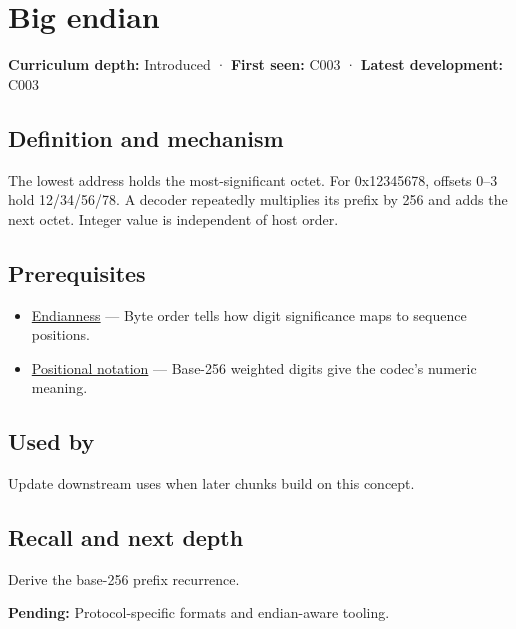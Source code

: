 \hypertarget{appendix-92e040df969a}{}\label{referencestart:appendix-92e040df969a}
\section{Big endian}\label{appendix-92e040df969a-big-endian}

\textbf{Curriculum depth:} Introduced · \textbf{First seen:} C003 · \textbf{Latest development:} C003

\subsection{Definition and mechanism}\label{appendix-92e040df969a-definition-and-mechanism}

The lowest address holds the most-significant octet. For 0x12345678, offsets 0--3 hold 12/34/56/78. A decoder repeatedly multiplies its prefix by 256 and adds the next octet. Integer value is independent of host order.

\subsection{Prerequisites}\label{appendix-92e040df969a-prerequisites}

\begin{itemize}
\tightlist
\item
  \hyperref[appendix-bc07c3d25b18]{Endianness} --- Byte order tells how digit significance maps to sequence positions.
\item
  \hyperref[appendix-83c3f28f7bda]{Positional notation} --- Base-256 weighted digits give the codec's numeric meaning.
\end{itemize}

\subsection{Used by}\label{appendix-92e040df969a-used-by}

Update downstream uses when later chunks build on this concept.

\subsection{Recall and next depth}\label{appendix-92e040df969a-recall-and-next-depth}

Derive the base-256 prefix recurrence.

\textbf{Pending:} Protocol-specific formats and endian-aware tooling.

